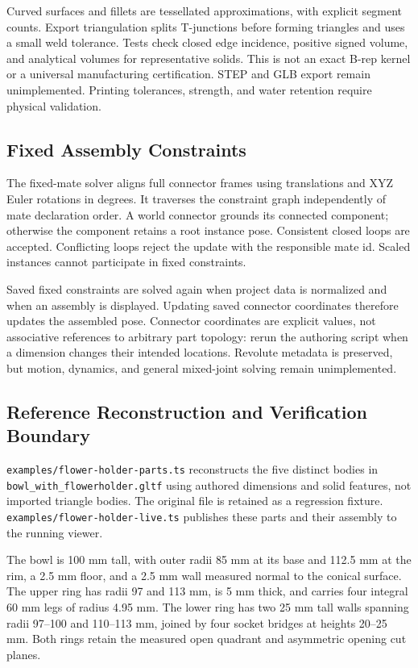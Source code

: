 \documentclass[11pt]{article}
\newcommand{\Type}[1]{\texttt{#1}}
\begin{document}
Curved surfaces and fillets are tessellated approximations, with explicit segment
counts. Export triangulation splits T-junctions before forming triangles and
uses a small weld tolerance. Tests check closed edge incidence, positive signed
volume, and analytical volumes for representative solids. This is not an exact
B-rep kernel or a universal manufacturing certification. STEP and GLB export
remain unimplemented. Printing tolerances, strength, and water retention require
physical validation.

\subsection{Fixed Assembly Constraints}

The fixed-mate solver aligns full connector frames using translations and XYZ
Euler rotations in degrees. It traverses the constraint graph independently of
mate declaration order. A world connector grounds its connected component;
otherwise the component retains a root instance pose. Consistent closed loops
are accepted. Conflicting loops reject the update with the responsible mate id.
Scaled instances cannot participate in fixed constraints.

Saved fixed constraints are solved again when project data is normalized and
when an assembly is displayed. Updating saved connector coordinates therefore
updates the assembled pose. Connector coordinates are explicit values, not
associative references to arbitrary part topology: rerun the authoring script
when a dimension changes their intended locations. Revolute metadata is preserved,
but motion, dynamics, and general mixed-joint solving remain unimplemented.

\subsection{Reference Reconstruction and Verification Boundary}

\Type{examples/flower-holder-parts.ts} reconstructs the five distinct bodies in
\Type{bowl\_with\_flowerholder.gltf} using authored dimensions and solid features,
not imported triangle bodies. The original file is retained as a regression
fixture. \Type{examples/flower-holder-live.ts} publishes these parts and their
assembly to the running viewer.

The bowl is 100 mm tall, with outer radii 85 mm at its base and 112.5 mm at the
rim, a 2.5 mm floor, and a 2.5 mm wall measured normal to the conical surface.
The upper ring has radii 97 and 113 mm, is 5 mm thick, and carries four integral
60 mm legs of radius 4.95 mm. The lower ring has two 25 mm tall walls spanning
radii 97--100 and 110--113 mm, joined by four socket bridges at heights 20--25 mm.
Both rings retain the measured open quadrant and asymmetric opening cut planes.
\end{document}
